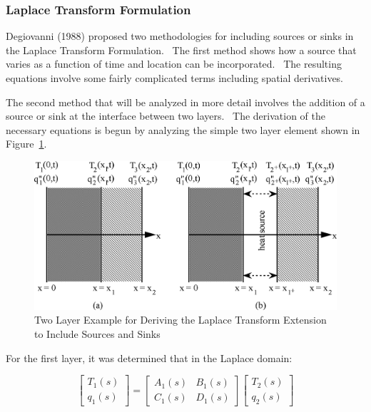 \subsubsection{Laplace Transform Formulation}\label{laplace-transform-formulation-1}

Degiovanni (1988) proposed two methodologies for including sources or sinks in the Laplace Transform Formulation.~ The first method shows how a source that varies as a function of time and location can be incorporated.~ The resulting equations involve some fairly complicated terms including spatial derivatives.

The second method that will be analyzed in more detail involves the addition of a source or sink at the interface between two layers.~ The derivation of the necessary equations is begun by analyzing the simple two layer element shown in Figure~\ref{fig:two-layer-example-for-deriving-the-laplace-transform-extension}.

\begin{figure}[htbp]
\centering
\includegraphics{media/image6009.png}
\caption{Two Layer Example for Deriving the Laplace Transform Extension to Include Sources and Sinks \protect \label{fig:two-layer-example-for-deriving-the-laplace-transform-extension}}
\end{figure}

For the first layer, it was determined that in the Laplace domain:

\begin{equation}
\left[ {\begin{array}{*{20}{c}}{{T_1}\left( s \right)}\\ {{q_1}\left( s \right)}\end{array}} \right] = \left[ {\begin{array}{*{20}{c}}{{A_1}\left( s \right)}&{{B_1}\left( s \right)}\\ {{C_1}\left( s \right)}&{{D_1}\left( s \right)}\end{array}} \right]\left[ {\begin{array}{*{20}{c}}{{T_2}\left( s \right)}\\ {{q_2}\left( s \right)}\end{array}} \right]
\end{equation}

